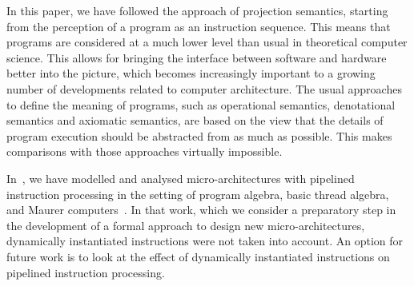 \documentclass[fleqn]{llncs}
\begin{document}
In this paper, we have followed the approach of projection semantics,
starting from the perception of a program as an instruction sequence.
This means that programs are considered at a much lower level than usual
in theoretical computer science.
This allows for bringing the interface between software and hardware
better into the picture, which becomes increasingly important to a
growing number of developments related to computer architecture.
The usual approaches to define the meaning of programs, such as
operational semantics, denotational semantics and axiomatic semantics,
are based on the view that the details of program execution should be
abstracted from as much as possible.
This makes comparisons with those approaches virtually impossible.

In~\cite{BM06b}, we have modelled and analysed micro-architectures with
pipelined instruction processing in the setting of program algebra,
basic thread algebra, and Maurer computers~\cite{Mau66a,Mau06a}.
In that work, which we consider a preparatory step in the development of
a formal approach to design new micro-architectures, dynamically
instantiated instructions were not taken into account.
An option for future work is to look at the effect of dynamically
instantiated instructions on pipelined instruction processing.



\end{document}
